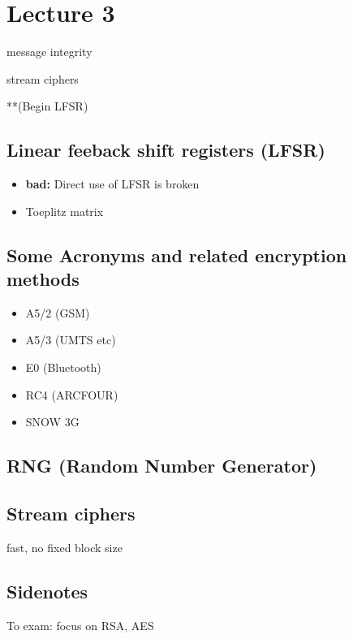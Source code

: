\section{Lecture 3}
message integrity

stream ciphers

**(Begin LFSR)
\subsection{Linear feeback shift registers (LFSR)}
\begin{itemize}
\item{\textbf{bad:}
        Direct use of LFSR is broken
}

\item{Toeplitz matrix}
\end{itemize}

\subsection{Some Acronyms and related encryption methods}
\begin{itemize}
\item A5/2 (GSM)
\item A5/3 (UMTS etc)
\item E0 (Bluetooth)
\item RC4 (ARCFOUR)
\item SNOW 3G
\end{itemize}


\subsection{RNG (Random Number Generator)}

\subsection{Stream ciphers}
 fast, no fixed block size


\subsection{Sidenotes}
To exam:
focus on RSA, AES 
